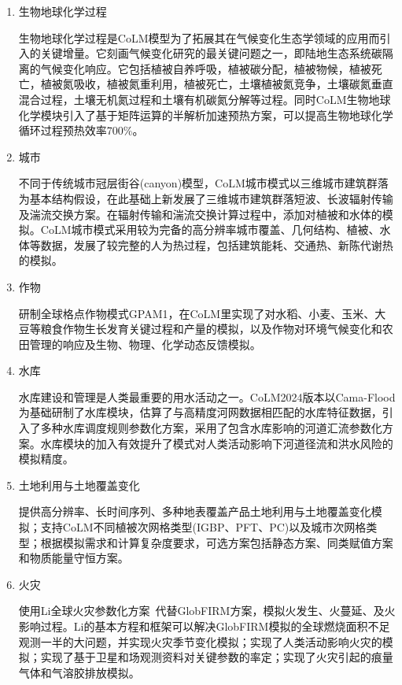 \begin{enumerate}[label={\arabic*)}]
\item 生物地球化学过程

  生物地球化学过程是CoLM模型为了拓展其在气候变化生态学领域的应用而引入的关键增量。它刻画气候变化研究的最关键问题之一，即陆地生态系统碳隔离的气候变化响应。它包括植被自养呼吸，植被碳分配，植被物候，植被死亡，植被氮吸收，植被氮重利用，植被死亡，土壤植被氮竞争，土壤碳氮垂直混合过程，土壤无机氮过程和土壤有机碳氮分解等过程。同时CoLM生物地球化学模块引入了基于矩阵运算的半解析加速预热方案，可以提高生物地球化学循环过程预热效率700\%。

\item 城市

  不同于传统城市冠层街谷(canyon)模型，CoLM城市模式以三维城市建筑群落为基本结构假设，在此基础上新发展了三维城市建筑群落短波、长波辐射传输及湍流交换方案。在辐射传输和湍流交换计算过程中，添加对植被和水体的模拟。CoLM城市模式采用较为完备的高分辨率城市覆盖、几何结构、植被、水体等数据，发展了较完整的人为热过程，包括建筑能耗、交通热、新陈代谢热的模拟。

\item 作物

  研制全球格点作物模式GPAM1，在CoLM里实现了对水稻、小麦、玉米、大豆等粮食作物生长发育关键过程和产量的模拟，以及作物对环境气候变化和农田管理的响应及生物、物理、化学动态反馈模拟。

\item 水库

  水库建设和管理是人类最重要的用水活动之一。CoLM2024版本以Cama-Flood为基础研制了水库模块，估算了与高精度河网数据相匹配的水库特征数据，引入了多种水库调度规则参数化方案，采用了包含水库影响的河道汇流参数化方案。水库模块的加入有效提升了模式对人类活动影响下河道径流和洪水风险的模拟精度。

\item 土地利用与土地覆盖变化

  提供高分辨率、长时间序列、多种地表覆盖产品土地利用与土地覆盖变化模拟；支持CoLM不同植被次网格类型(IGBP、PFT、PC)以及城市次网格类型；根据模拟需求和计算复杂度要求，可选方案包括静态方案、同类赋值方案和物质能量守恒方案。

\item 火灾

  使用Li全球火灾参数化方案~\citep{LiF2012,LiF2013,LiF2017,LiF2019}代替GlobFIRM方案，模拟火发生、火蔓延、及火影响过程。Li的基本方程和框架可以解决GlobFIRM模拟的全球燃烧面积不足观测一半的大问题，并实现火灾季节变化模拟；实现了人类活动影响火灾的模拟；实现了基于卫星和场观测资料对关键参数的率定；实现了火灾引起的痕量气体和气溶胶排放模拟。


\end{enumerate}
